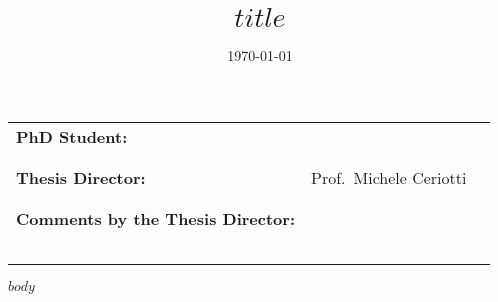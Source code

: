 \documentclass[oneside,article,12pt]{memoir}
\date[\mydate]{\today}
\def\mytitle{$title$}
\def\myauthor{$author.name$}
\def\myauthor{\latexauthor}
\begin{document}
\title{\mytitle}
\author{\myauthor}

\ifx\mydate\undefined
\else
	\date{\mydate}
\fi

\maketitle
\thispagestyle{firstpage}
\vspace{4cm}
\begin{tabular}{m{6cm} m{5cm} m{3cm}}
  \bfseries{PhD Student:} & \myauthor & \dotfill{} \\\\\\
  \bfseries{Thesis Director:} & Prof.~Michele Ceriotti & \dotfill{} \\\\\\
  \bfseries{Comments by the Thesis Director:} & \multicolumn{2}{c}{\dotfill{}}\\
  & \multicolumn{2}{c}{\dotfill{}}\\
  & \multicolumn{2}{c}{\dotfill{}}\\
  & \multicolumn{2}{c}{\dotfill{}}\\
  & \multicolumn{2}{c}{\dotfill{}}\\
  & \multicolumn{2}{c}{\dotfill{}}\\
\end{tabular}%

\pagebreak
\tableofcontents
\thispagestyle{empty}
\pagebreak

\pagestyle{fancy}
\fancyhead{}
\setlength{\headheight}{24pt}
\fancyhead[LO]{\thepage}
\fancyhead[RO]{\myauthor}
\fancyhead[RE]{\thepage}
\fancyfoot{}

\mainmatter
%
%
$body$
%
%
\end{document}
